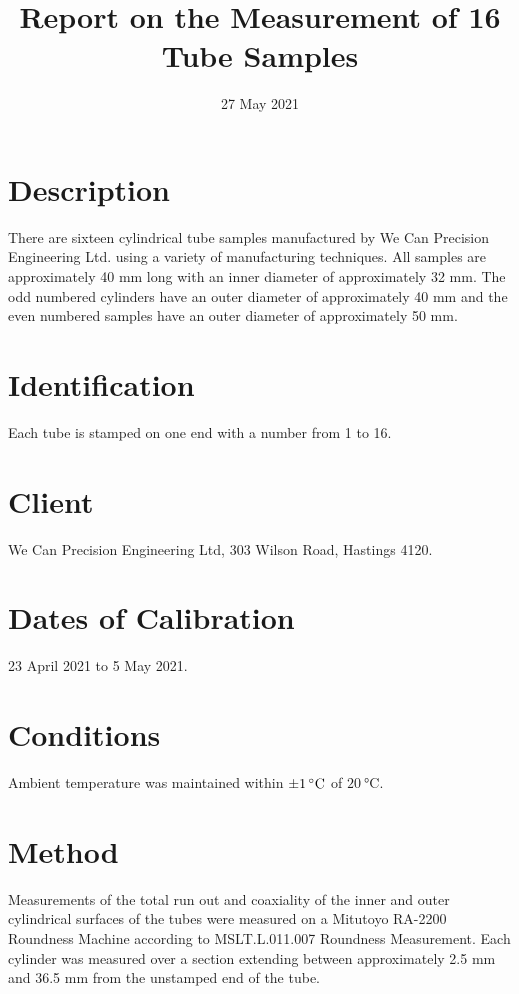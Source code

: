 \documentclass[CIPM]{MSLCalCert}
\begin{document}
 \date{27 May 2021}   %
 
 
 \title{
 	Report on the Measurement of 16 Tube Samples 
 }
 \maketitlepage

	
%
\section{Description}
There are sixteen cylindrical tube samples manufactured by We Can Precision Engineering Ltd. using a variety of manufacturing techniques. All samples are approximately 40 mm long with an inner diameter of approximately 32 mm. The odd numbered cylinders have an outer diameter of approximately 40 mm and the even numbered samples have an outer diameter of approximately 50 mm.


\section{Identification}
Each tube is stamped on one end with a number from 1 to 16.

\section{Client}
We Can Precision Engineering Ltd, 303 Wilson Road, Hastings 4120.

\section{Dates of Calibration}
23 April 2021 to 5 May 2021.

\section{Conditions}
Ambient temperature was maintained within $\SI{\pm 1}{\celsius}$ of $\SI{20}{\celsius}$.

\section{Method}
Measurements of the total run out and coaxiality of the inner and outer cylindrical surfaces of the tubes were measured on a Mitutoyo RA-2200 Roundness Machine according to MSLT.L.011.007 Roundness Measurement. Each cylinder was measured over a section extending between approximately 2.5 mm and 36.5 mm from the unstamped end of the tube. 
\end{document}
